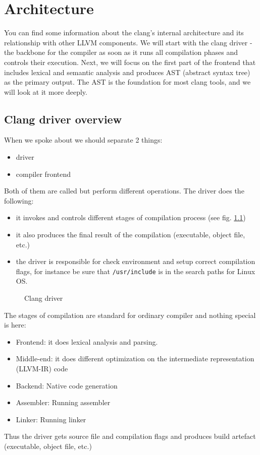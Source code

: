 \chapter{Architecture}
You can find some information about the clang’s internal architecture and its
relationship with other LLVM components. We will start with the clang driver -
the backbone for the compiler as soon as it runs all compilation phases and
controls their execution. Next, we will focus on the first part of the frontend
that includes lexical and semantic analysis and produces AST (abstract syntax
tree) as the primary output. The AST is the foundation for most clang tools, and
we will look at it more deeply. 

\section{Clang driver overview}

When we spoke about \clang we should separate 2 things:
\begin{itemize}
\item driver
\item compiler frontend 
\end{itemize}
Both of them are called \clang but perform different
operations. The driver does the following:
\begin{itemize}
  \item it invokes and controls different stages of compilation process (see
    fig. \ref{fig:clang_driver})
  \item it also produces the final result of the compilation (executable,
      object file, etc.)
  \item the driver is responsible for check environment and setup correct
      compilation flags, for instance be sure that
      \texttt{/usr/include} is in the search paths for Linux OS.    
\end{itemize}

\begin{figure}
\begin{center}
\end{center}
  \caption{Clang driver}
  \label{fig:clang_driver}
\end{figure}
The stages of compilation are standard for ordinary compiler and nothing special
is here:
\begin{itemize}
\item Frontend: it does lexical analysis and parsing.
\item Middle-end: it does different optimization on the intermediate
  representation (LLVM-IR) code
\item Backend: Native code generation
\item Assembler: Running assembler
\item Linker: Running linker
\end{itemize}
Thus the driver gets source file and compilation flags and produces build
artefact (executable, object file, etc.)

